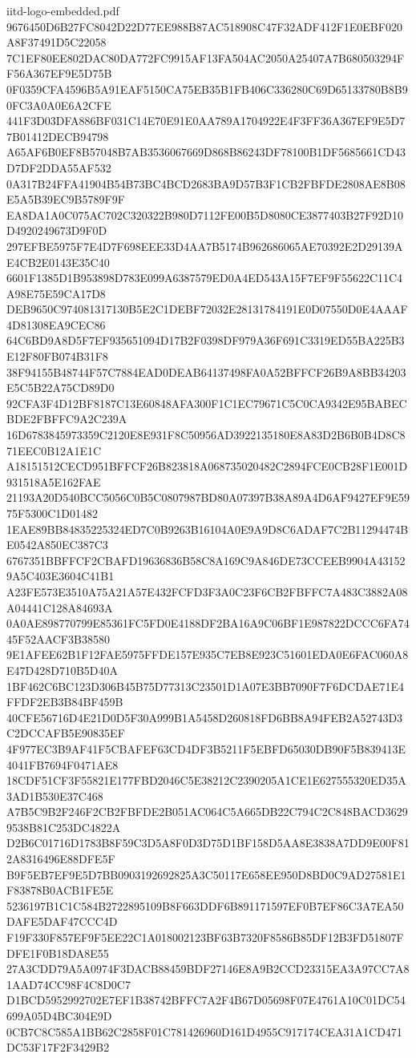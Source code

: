 \begin{filecontents*}[overwrite]{iitd-logo-embedded.pdf}
9676450D6B27FC8042D22D77EE988B87AC518908C47F32ADF412F1E0EBF020A8F37491D5C22058
7C1EF80EE802DAC80DA772FC9915AF13FA504AC2050A25407A7B680503294FF56A367EF9E5D75B
0F0359CFA4596B5A91EAF5150CA75EB35B1FB406C336280C69D65133780B8B90FC3A0A0E6A2CFE
441F3D03DFA886BF031C14E70E91E0AA789A1704922E4F3FF36A367EF9E5D77B01412DECB94798
A65AF6B0EF8B57048B7AB3536067669D868B86243DF78100B1DF5685661CD43D7DF2DDA55AF532
0A317B24FFA41904B54B73BC4BCD2683BA9D57B3F1CB2FBFDE2808AE8B08E5A5B39EC9B5789F9F
EA8DA1A0C075AC702C320322B980D7112FE00B5D8080CE3877403B27F92D10D4920249673D9F0D
297EFBE5975F7E4D7F698EEE33D4AA7B5174B962686065AE70392E2D29139AE4CB2E0143E35C40
6601F1385D1B953898D783E099A6387579ED0A4ED543A15F7EF9F55622C11C4A98E75E59CA17D8
DEB9650C974081317130B5E2C1DEBF72032E28131784191E0D07550D0E4AAAF4D81308EA9CEC86
64C6BD9A8D5F7EF935651094D17B2F0398DF979A36F691C3319ED55BA225B3E12F80FB074B31F8
38F94155B48744F57C7884EAD0DEAB64137498FA0A52BFFCF26B9A8BB34203E5C5B22A75CD89D0
92CFA3F4D12BF8187C13E60848AFA300F1C1EC79671C5C0CA9342E95BABECBDE2FBFFC9A2C239A
16D6783845973359C2120E8E931F8C50956AD3922135180E8A83D2B6B0B4D8C871EEC0B12A1E1C
A18151512CECD951BFFCF26B823818A068735020482C2894FCE0CB28F1E001D931518A5E162FAE
21193A20D540BCC5056C0B5C0807987BD80A07397B38A89A4D6AF9427EF9E5975F5300C1D01482
1EAE89BB84835225324ED7C0B9263B16104A0E9A9D8C6ADAF7C2B11294474BE0542A850EC387C3
6767351BBFFCF2CBAFD19636836B58C8A169C9A846DE73CCEEB9904A431529A5C403E3604C41B1
A23FE573E3510A75A21A57E432FCFD3F3A0C23F6CB2FBFFC7A483C3882A08A04441C128A84693A
0A0AE898770799E85361FC5FD0E4188DF2BA16A9C06BF1E987822DCCC6FA7445F52AACF3B38580
9E1AFEE62B1F12FAE5975FFDE157E935C7EB8E923C51601EDA0E6FAC060A8E47D428D710B5D40A
1BF462C6BC123D306B45B75D77313C23501D1A07E3BB7090F7F6DCDAE71E4FFDF2EB3B84BF459B
40CFE56716D4E21D0D5F30A999B1A5458D260818FD6BB8A94FEB2A52743D3C2DCCAFB5E90835EF
4F977EC3B9AF41F5CBAFEF63CD4DF3B5211F5EBFD65030DB90F5B839413E4041FB7694F0471AE8
18CDF51CF3F55821E177FBD2046C5E38212C2390205A1CE1E627555320ED35A3AD1B530E37C468
A7B5C9B2F246F2CB2FBFDE2B051AC064C5A665DB22C794C2C848BACD36299538B81C253DC4822A
D2B6C01716D1783B8F59C3D5A8F0D3D75D1BF158D5AA8E3838A7DD9E00F812A8316496E88DFE5F
B9F5EB7EF9E5D7BB0903192692825A3C50117E658EE950D8BD0C9AD27581E1F83878B0ACB1FE5E
5236197B1C1C584B2722895109B8F663DDF6B891171597EF0B7EF86C3A7EA50DAFE5DAF47CCC4D
F19F330F857EF9F5EE22C1A018002123BF63B7320F8586B85DF12B3FD51807FDFE1F0B18DA8E55
27A3CDD79A5A0974F3DACB88459BDF27146E8A9B2CCD23315EA3A97CC7A81AAD74CC98F4C8D0C7
D1BCD5952992702E7EF1B38742BFFC7A2F4B67D05698F07E4761A10C01DC54699A05D4BC304E9D
0CB7C8C585A1BB62C2858F01C781426960D161D4955C917174CEA31A1CD471DC53F17F2F3429B2

\end{filecontents*}
